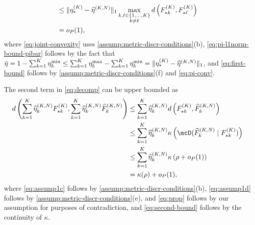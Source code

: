 \begin{align}
	 & \le \Vert \eta^{(\numcomps)}_{\star} - \widehat{\eta}^{(\numcomps,\numobs)}\Vert_{1} \max_{\substack{k,\ell\in \{1,\ldots,K\} \\ 
   k\neq \ell}} d\left(F^{(\numcomps)}_{\star k}, F^{(\numcomps)}_{\star \ell}\right) \\
	 & = \op(1), \label{eq:first-bound}
\end{align}
where \cref{eq:joint-convexity} uses  \cref{assump:metric-discr-conditions}(b), \cref{eq:pi-l1norm-bound-pibar} follows by the fact that $\bar{\eta}=1- \sum_{k=1}^{K}\eta_k^{\min} \le  \sum_{k=1}^{K}\eta_k^{\max}-\sum_{k=1}^{K}\eta_k^{\min}=\Vert \eta^{(K)}_{\star} - \widehat{\eta}^{(K,N)} \Vert_{1}$, and \cref{eq:first-bound} follows by  \cref{assump:metric-discr-conditions}(f) and \cref{eq:pi-conv}.

The second term in \cref{eq:decomp} can be upper bounded as
\begin{align}
	d\left(\sum_{k = 1}^{\numcomps}  \widehat{\eta}_k^{(\numcomps, \numobs)} F^{(\numcomps)}_{\star k}, \sum_{k=1}^{\numcomps}\widehat{\eta}_k^{(\numcomps, \numobs)} \widehat{F}_k^{(\numcomps, \numobs)}\right)
	 & \le   \sum_{k = 1}^{\numcomps}  \widehat{\eta}_k^{(\numcomps, \numobs)}d\left( F^{(\numcomps)}_{\star k},  \widehat{F}_k^{(\numcomps, \numobs)}\right)  \label{eq:assump1c}          \\
	 & \le   \sum_{k = 1}^{\numcomps}  \widehat{\eta}_k^{(\numcomps, \numobs)}\kappa\left(\discr{\widehat{F}_k^{(\numcomps, \numobs)}}{F^{(\numcomps)}_{\star k}}\right)  \label{eq:assump1d} \\
	 & \le  \sum_{k = 1}^{\numcomps}  \widehat{\eta}_k^{(\numcomps, \numobs)}\kappa\left(\rho + \op(1) \right) \label{eq:prop}                                                                     \\
	 & = \kappa(\rho) + \op(1) \label{eq:second-bound},
\end{align}
where %
\cref{eq:assump1c} follows by  \cref{assump:metric-discr-conditions}(b),
\cref{eq:assump1d} follows by  \cref{assump:metric-discr-conditions}(e), and
\cref{eq:prop} follows by our assumption for purposes of contradiction, and  \cref{eq:second-bound} follows by the continuity of $\kappa$. %

